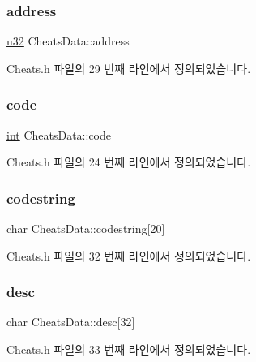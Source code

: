 \subsubsection{\texorpdfstring{address}{address}}
{\footnotesize\ttfamily \mbox{\hyperlink{_system_8h_a10e94b422ef0c20dcdec20d31a1f5049}{u32}} Cheats\+Data\+::address}



Cheats.\+h 파일의 29 번째 라인에서 정의되었습니다.

\mbox{\label{struct_cheats_data_a24cc3911cdbf485ce42b401873e2e269}} 
\subsubsection{\texorpdfstring{code}{code}}
{\footnotesize\ttfamily \mbox{\hyperlink{_util_8cpp_a0ef32aa8672df19503a49fab2d0c8071}{int}} Cheats\+Data\+::code}



Cheats.\+h 파일의 24 번째 라인에서 정의되었습니다.

\mbox{\label{struct_cheats_data_a4163c46e82595675cedca34ad19d6f43}} 
\subsubsection{\texorpdfstring{codestring}{codestring}}
{\footnotesize\ttfamily char Cheats\+Data\+::codestring\mbox{[}20\mbox{]}}



Cheats.\+h 파일의 32 번째 라인에서 정의되었습니다.

\mbox{\label{struct_cheats_data_a12223e792c360411d694a8e2506dc90e}} 
\subsubsection{\texorpdfstring{desc}{desc}}
{\footnotesize\ttfamily char Cheats\+Data\+::desc\mbox{[}32\mbox{]}}



Cheats.\+h 파일의 33 번째 라인에서 정의되었습니다.

